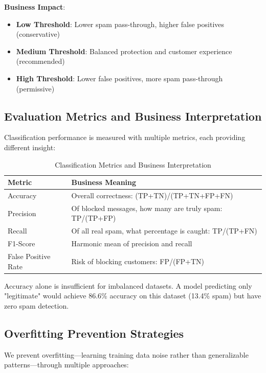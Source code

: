 \documentclass[12pt,a4paper]{article}
\begin{document}
\textbf{Business Impact}:
\begin{itemize}
    \item \textbf{Low Threshold}: Lower spam pass-through, higher false positives (conservative)
    \item \textbf{Medium Threshold}: Balanced protection and customer experience (recommended)
    \item \textbf{High Threshold}: Lower false positives, more spam pass-through (permissive)
\end{itemize}

\subsection{Evaluation Metrics and Business Interpretation}

Classification performance is measured with multiple metrics, each providing different insight:

\begin{table}[H]
\centering
\begin{tabular}{ll}
\toprule
\textbf{Metric} & \textbf{Business Meaning} \\
\midrule
Accuracy & Overall correctness: (TP+TN)/(TP+TN+FP+FN) \\
Precision & Of blocked messages, how many are truly spam: TP/(TP+FP) \\
Recall & Of all real spam, what percentage is caught: TP/(TP+FN) \\
F1-Score & Harmonic mean of precision and recall \\
False Positive Rate & Risk of blocking customers: FP/(FP+TN) \\
\bottomrule
\end{tabular}
\caption{Classification Metrics and Business Interpretation}
\end{table}

Accuracy alone is insufficient for imbalanced datasets. A model predicting only "legitimate" would achieve 86.6\% accuracy on this dataset (13.4\% spam) but have zero spam detection.

\subsection{Overfitting Prevention Strategies}

We prevent overfitting—learning training data noise rather than generalizable patterns—through multiple approaches:
\end{document}
